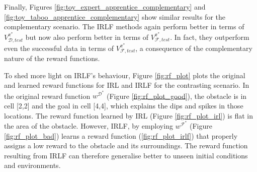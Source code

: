 \documentclass{aamas2016}
\begin{document}
Finally, Figures \ref{fig:toy_expert_apprentice_complementary} and \ref{fig:toy_taboo_apprentice_complementary} show similar results for the complementary scenario.  The IRLF methods again perform better in terms of $V^{\pi^*}_{\mathcal{D},test}$ but now also perform better in terms of $V^{\pi^*}_{\mathcal{F},test}$.  In fact, they outperform even the successful data in terms of $V^{\pi^*}_{\mathcal{F},test}$, a consequence of the complementary nature of the reward functions. 

To shed more light on IRLF's behaviour, Figure \ref{fig:rf_plot} plots the original and learned reward functions for IRL and IRLF for the contrasting scenario. In the original reward function $w^{\mathcal{D}^*}$ (Figure \ref{fig:rf_plot_good}), the obstacle is in cell [2,2] and the goal in cell [4,4], which explains the dips and spikes in those locations.  The reward function learned by IRL (Figure \ref{fig:rf_plot_irl}) is flat in the area of the obstacle. However, IRLF, by employing $w^{\mathcal{F}^*}$ (Figure \ref{fig:rf_plot_bad}) learns a reward function (\ref{fig:rf_plot_irlf}) that properly assigns a low reward to the obstacle and its surroundings. The reward function resulting from IRLF can therefore generalise better to unseen initial conditions and environments.


\end{document}
